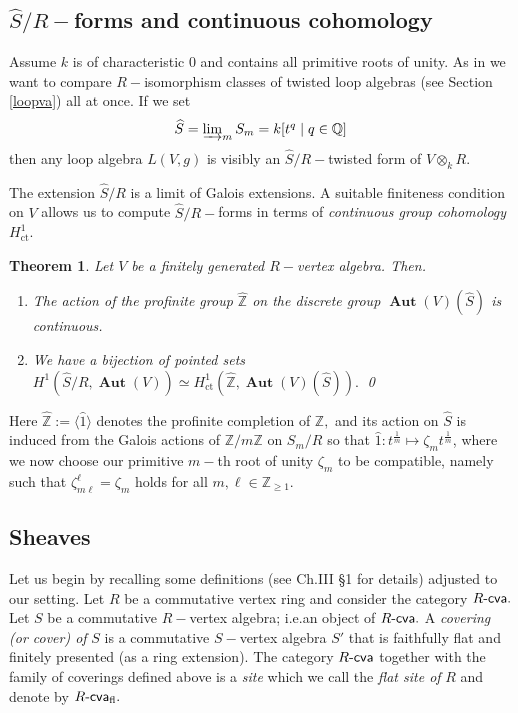 \documentclass{article}
\newtheorem{thm}{Theorem}[section]
\theoremstyle{definition}
\def\BAut{\ensuremath{\operatorname{\mathbf{Aut}}}}
\def\Rcva{\ensuremath{R\text{-\textup{\textsf{cva}}}}}
\def\Z{\ensuremath{\mathbb Z}}
\begin{document}
\subsection{$\widehat S/R-$forms and continuous cohomology} \label{H1hat}

Assume $k$ is of characteristic $0$ and contains all primitive roots of unity. As in \cite{KLP} we want to compare $R-$isomorphism classes of twisted loop algebras (see Section \ref{loopva}) all at once.     If we set \[\widehat S = \textstyle\varinjlim_{m} S_m = k[t^q \mid q \in \mathbb Q]\] then any loop algebra $L(V,g)$ is visibly an $\widehat S/R-$twisted form of $V \otimes_k R.$ 
      
The extension $\widehat S/R$ is a limit of Galois extensions. A suitable finiteness condition on $V$ allows us to compute $\widehat S/R-$forms in terms of \emph{continuous group cohomology} $H^1_{\operatorname{ct}}$. 

\begin{thm} Let $V$ be a finitely generated  $R-$vertex algebra. Then.
\begin{enumerate}[label = \textup{\alph*)}]
	\item \label{ct1} The action of the profinite group $\widehat{\mathbb Z}$ on the discrete group $\BAut(V)(\widehat S)$ is continuous.
        
        \item \label{ctH1}  We have a bijection of pointed sets $H^1(\widehat S/R, \BAut(V)) \simeq H^1_{\operatorname{ct}} (\widehat {\mathbb Z}, \BAut(V)(\widehat S)).$   \qed \end{enumerate}  \end{thm} 
Here $\widehat{\mathbb Z} := \langle \hat{1} \rangle$ denotes the profinite completion of $\Z,$ and its action on $\widehat S$ is induced from the Galois actions of $\mathbb Z/m \mathbb Z$ on $S_m/R$ so that $\hat{1} \colon t^{\frac{1}{m}} \mapsto \zeta_m t^{\frac{1}{m}}$, where we now choose our primitive $m-$th root of unity  $\zeta_m$ to be compatible, namely such that $\zeta_{m \ell}^\ell = \zeta_m$ holds for all $m, \ell \in \mathbb Z_{\geq 1}$.


\subsection {Sheaves} \label{sheaf}
Let us begin by recalling some definitions (see \cite{DeGa} Ch.III \S1 for details) adjusted to our setting. Let $R$ be a commutative vertex ring and consider the category $\Rcva.$ Let $S$ be a commutative $R-$vertex algebra; i.e.\@ an object of $\Rcva.$ A {\it covering (or cover) of} $S$ is a commutative $S-$vertex algebra $S'$ that is faithfully flat and finitely presented (as a ring extension). The category $\Rcva$ together with the family of coverings defined above is a {\it site} \cite[Tag 00VH]{SP} which we call the {\it flat site of} $R$ and denote by $\Rcva_{\rm fl}.$
\medskip
\end{document}
